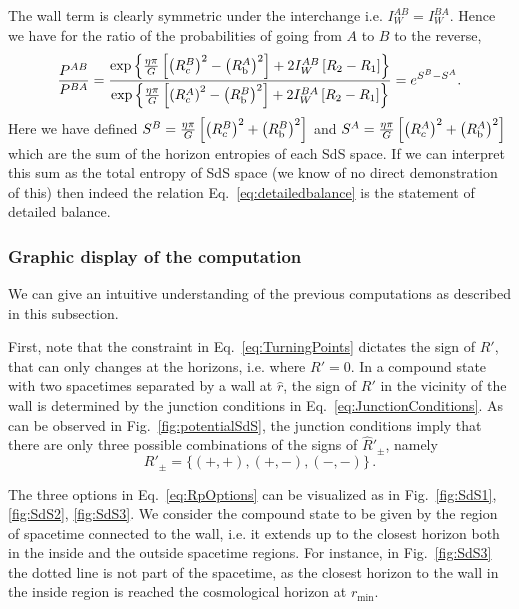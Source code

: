 \documentclass[a4paper,11pt]{article}
\numberwithin{equation}{section}
\numberwithin{equation}{section}
\begin{document}
The wall term is clearly symmetric under the interchange i.e. $I_{W}^{AB}=I_{W}^{BA}$. Hence we have for the ratio of the probabilities of going from $A$ to $B$ to the reverse,
\begin{equation}
\frac{P^{AB}}{P^{BA}}=\frac{\exp\left\{ \frac{\eta\pi}{G}\left[\left(R_{c}^{B}\right)^{2}-\left(R_{{\rm {\rm b}}}^{A}\right)^{2}\right]+2I_{W}^{AB}\left[R_{2}-R_{1}\right]\right\} }{\exp\left\{ \frac{\eta\pi}{G}\left[\left(R_{c}^{A}\right)^{2}-\left(R_{{\rm {\rm b}}}^{B}\right)^{2}\right]+2I_{W}^{BA}\left[R_{2}-R_{1}\right]\right\} }=e^{S^{B}-S^{A}}.\label{eq:detailedbalance}
\end{equation}
Here we have defined $S^{B}=\frac{\eta\pi}{G}\left[\left(R_{c}^{B}\right)^{2}+\left(R_{{\rm {\rm b}}}^{B}\right)^{2}\right]$
and $S^{A}=\frac{\eta\pi}{G}\left[\left(R_{c}^{A}\right)^{2}+\left(R_{{\rm {\rm b}}}^{A}\right)^{2}\right]$
which are the sum of the horizon entropies of each SdS space. If 
we can interpret this sum as the total entropy of SdS space (we know
of no direct demonstration of this) then indeed the relation Eq.~\eqref{eq:detailedbalance}
is the statement of detailed balance.

\subsubsection*{Graphic display of the computation}

We can give an intuitive understanding of the previous computations as described in this subsection.

First, note that the constraint in Eq.~\eqref{eq:TurningPoints} dictates the sign of $R'$, that can only changes at the horizons, i.e. where $R' = 0$. In a compound state with two spacetimes separated by a wall at $\hat{r}$, the sign of $R'$ in the vicinity of the wall is determined by the junction conditions in Eq.~\eqref{eq:JunctionConditions}. As can be observed in Fig.~\ref{fig:potentialSdS}, the junction conditions imply that there are only three possible combinations of the signs of $\hat{R}'_{\pm}$, namely
\begin{equation}
R'_{\pm} = \{(+,+), (+, -), (-, -)\} \,. \label{eq:RpOptions}
\end{equation}

The three options in Eq.~\eqref{eq:RpOptions} can be visualized as in Fig.~\ref{fig:SdS1}, \ref{fig:SdS2}, \ref{fig:SdS3}. We consider the compound state to be given by the region of spacetime connected to the wall, i.e. it extends up to the closest horizon both in the inside and the outside spacetime regions. For instance, in Fig.~\ref{fig:SdS3}  the dotted line is not part of the spacetime, as the closest horizon to the wall in the inside region is reached the cosmological horizon at $r_{\text{min}}$.
\end{document}
